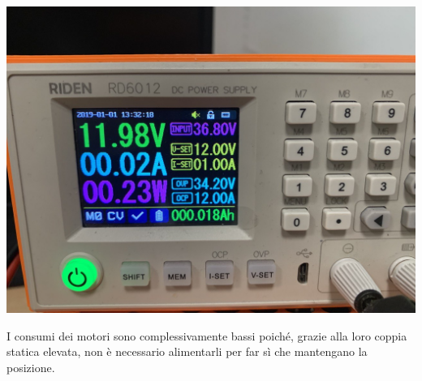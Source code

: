 \begin{center}
\includegraphics[scale=0.3]{figures/image1.png}
\captionsetup{type=figure}
\end{center}

\noindent I consumi dei motori sono complessivamente bassi poiché, grazie alla loro coppia statica elevata, non è necessario
alimentarli per far sì che mantengano la posizione.
